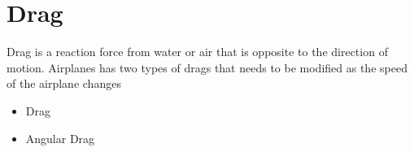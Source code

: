 \section{Drag}

Drag is a reaction force from water or air that is opposite to the direction
of motion. Airplanes has two types of drags that needs to be modified as the
speed of the airplane changes

\begin{itemize}
  \item Drag
  \item Angular Drag
\end{itemize}
